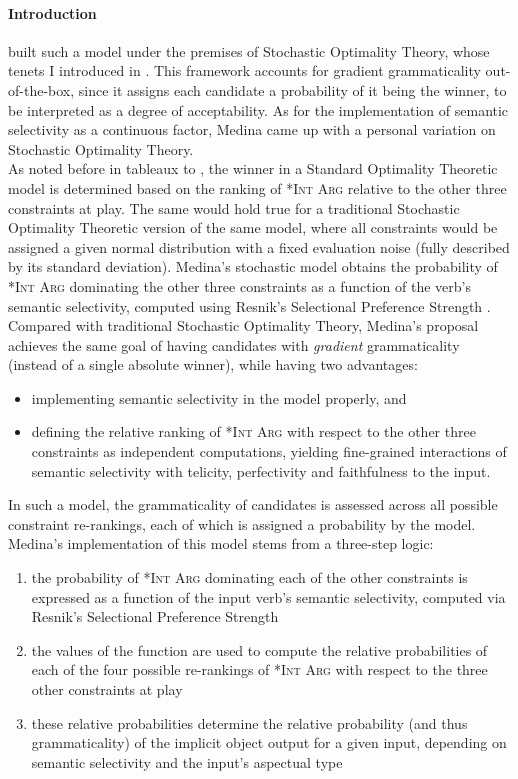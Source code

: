 \paragraph{Introduction} \textcite{Medina2007} built such a model under the premises of Stochastic Optimality Theory, whose tenets I introduced in . This framework accounts for gradient grammaticality out-of-the-box, since it assigns each candidate a probability of it being the winner, to be interpreted as a degree of acceptability. As for the implementation of semantic selectivity as a continuous factor, Medina came up with a personal variation on Stochastic Optimality Theory.\\
As noted before in tableaux  to , the winner in a Standard Optimality Theoretic model is determined based on the ranking of \textsc{*Int Arg} relative to the other three constraints at play. The same would hold true for a traditional Stochastic Optimality Theoretic version of the same model, where all constraints would be assigned a given normal distribution with a fixed evaluation noise (fully described by its standard deviation). Medina's stochastic model obtains the probability of \textsc{*Int Arg} dominating the other three constraints as a function of the verb's semantic selectivity, computed using Resnik's Selectional Preference Strength \parencite{Resnik1993,Resnik1996}. Compared with traditional Stochastic Optimality Theory, Medina's proposal achieves the same goal of having candidates with \textit{gradient} grammaticality (instead of a single absolute winner), while having two advantages:
\begin{itemize}
    \item implementing semantic selectivity in the model properly, and
    \item defining the relative ranking of \textsc{*Int Arg} with respect to the other three constraints as independent computations, yielding fine-grained interactions of semantic selectivity with telicity, perfectivity and faithfulness to the input.
\end{itemize}
In such a model, the grammaticality of candidates is assessed across all possible constraint re-rankings, each of which is assigned a probability by the model. Medina's implementation of this model stems from a three-step logic:
\begin{enumerate}
    \item the probability of \textsc{*Int Arg} dominating each of the other constraints is expressed as a function of the input verb's semantic selectivity, computed via Resnik's Selectional Preference Strength
    \item the values of the function are used to compute the relative probabilities of each of the four possible re-rankings of \textsc{*Int Arg} with respect to the three other constraints at play
    \item these relative probabilities determine the relative probability (and thus grammaticality) of the implicit object output for a given input, depending on semantic selectivity and the input's aspectual type
\end{enumerate}

